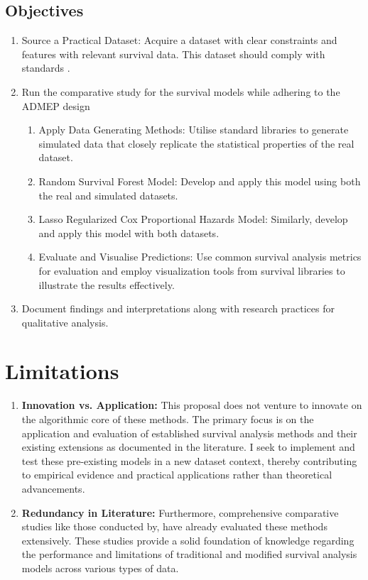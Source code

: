 \subsection{Objectives}
\begin{enumerate}
    \item Source a Practical Dataset: Acquire a dataset with clear constraints and features with relevant survival data. This dataset should comply with standards \parencite{wilkinson_fair_2016}. 
    \item Run the comparative study for the survival models while adhering to the ADMEP design \parencite{morris_using_2019}
    \begin{enumerate}
        \item Apply Data Generating Methods: Utilise standard libraries to generate simulated data that closely replicate the statistical properties of the real dataset.
        \item Random Survival Forest Model: Develop and apply this model using both the real and simulated datasets.
        \item Lasso Regularized Cox Proportional Hazards Model: Similarly, develop and apply this model with both datasets.
        \item Evaluate and Visualise Predictions: Use common survival analysis metrics for evaluation and employ visualization tools from survival libraries to illustrate the results effectively.
    \end{enumerate}
    \item Document findings and interpretations along with research practices for qualitative analysis.
\end{enumerate}
 
\section{Limitations}
\begin{enumerate}
    \item \textbf{Innovation vs. Application:} This proposal does not venture to innovate on the algorithmic core of these methods. The primary focus is on the application and evaluation of established survival analysis methods and their existing extensions as documented in the literature. I seek to implement and test these pre-existing models in a new dataset context, thereby contributing to empirical evidence and practical applications rather than theoretical advancements.
    \item \textbf{Redundancy in Literature:} Furthermore, comprehensive comparative studies like those conducted by, \parencite{kurt_omurlu_comparisons_2009} \parencite{smith_scoping_2022} have already evaluated these methods extensively. These studies provide a solid foundation of knowledge regarding the performance and limitations of traditional and modified survival analysis models across various types of data.
\end{enumerate}

